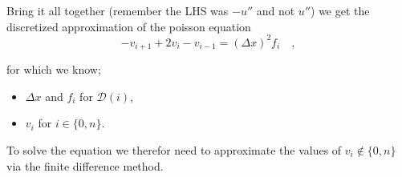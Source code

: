 \documentclass[final, 3p, times, 11.5pt]{article}
\begin{document}
Bring it all together (remember the LHS was $-u''$ and not $u''$) we get the discretized approximation of the poisson equation
\begin{equation}
\label{eq:discrete_poissoneq}
- v_{i+1} + 2v_i - v_{i-1} = 
(\Delta x)^2 f_i \quad ,
\end{equation}

for which we know;
\begin{itemize}
    \item $\Delta x$ and $f_i$ for $\mathcal{D}(i)$,
    \item $v_i$ for $i \in \{0, n\}$.
\end{itemize}

To solve the equation we therefor need to approximate the values of $v_i \notin \{0, n\}$ via the finite difference method. 
\end{document}
